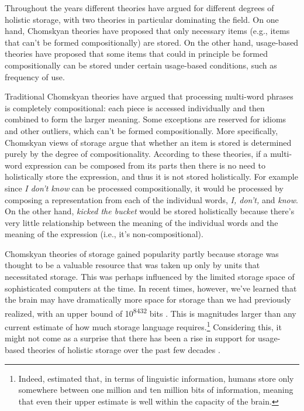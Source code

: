 \documentclass[
  authoryear,
  preprint,
  1p,
  onecolumn]{elsarticle}
\begin{document}
Throughout the years different theories have argued for different
degrees of holistic storage, with two theories in particular dominating
the field. On one hand, Chomskyan theories
\citep[e.g.,][]{chomskyAspectsTheorySyntax1965} have proposed that only
necessary items (e.g., items that can't be formed compositionally) are
stored. On the other hand, usage-based theories
\citep[e.g.,][]{bybee2003} have proposed that some items that could in
principle be formed compositionally can be stored under certain
usage-based conditions, such as frequency of use.

Traditional Chomskyan theories
\citep[e.g.,][]{chomskyAspectsTheorySyntax1965} have argued that
processing multi-word phrases is completely compositional: each piece is
accessed individually and then combined to form the larger meaning. Some
exceptions are reserved for idioms and other outliers, which can't be
formed compositionally. More specifically, Chomskyan views of storage
argue that whether an item is stored is determined purely by the degree
of compositionality. According to these theories, if a multi-word
expression can be composed from its parts then there is no need to
holistically store the expression, and thus it is not stored
holistically. For example since \emph{I don't know} can be processed
compositionally, it would be processed by composing a representation
from each of the individual words, \emph{I, don't,} and \emph{know}. On
the other hand, \emph{kicked the bucket} would be stored holistically
because there's very little relationship between the meaning of the
individual words and the meaning of the expression (i.e., it's
non-compositional).

Chomskyan theories of storage gained popularity partly because storage
was thought to be a valuable resource that was taken up only by units
that necessitated storage. This was perhaps influenced by the limited
storage space of sophisticated computers at the time. In recent times,
however, we've learned that the brain may have dramatically more space
for storage than we had previously realized, with an upper bound of
10\textsuperscript{8432} bits \citep{wang2003}. This is magnitudes
larger than any current estimate of how much storage language
requires.\footnote{Indeed, \citet{mollica2019} estimated that, in terms
  of linguistic information, humans store only somewhere between one
  million and ten million bits of information, meaning that even their
  upper estimate is well within the capacity of the brain.} Considering
this, it might not come as a surprise that there has been a rise in
support for usage-based theories of holistic storage over the past few
decades
\citep{kapatsinski2009, kapatsinski2018, stembergerFrequencyLexicalStorage1986, stemberger2004, morgan2016, bybee1999, bybee2001, bybee2002, bybee2003, baayenDutchInflectionRules2002, ambridgeStoredAbstractionsRadical2020, zangParafovealProcessingChinese2024}.
\end{document}
